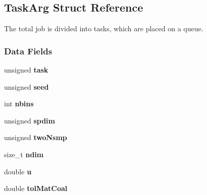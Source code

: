 \hypertarget{struct_task_arg}{\subsection{\-Task\-Arg \-Struct \-Reference}
\label{struct_task_arg}
}


\-The total job is divided into tasks, which are placed on a queue.  


\subsubsection*{\-Data \-Fields}
\begin{DoxyCompactItemize}
\item 
\hypertarget{struct_task_arg_ab8f93b1faba2a3b90657abf6688125b0}{unsigned {\bfseries task}}\label{struct_task_arg_ab8f93b1faba2a3b90657abf6688125b0}

\item 
\hypertarget{struct_task_arg_aacba1da926a87a14ebc43cdabc75705a}{unsigned {\bfseries seed}}\label{struct_task_arg_aacba1da926a87a14ebc43cdabc75705a}

\item 
\hypertarget{struct_task_arg_a94c04d470db4d9f1d699e5c473ead0ce}{int {\bfseries nbins}}\label{struct_task_arg_a94c04d470db4d9f1d699e5c473ead0ce}

\item 
\hypertarget{struct_task_arg_ad937451af34c15c5a44665c8c1209a9c}{unsigned {\bfseries spdim}}\label{struct_task_arg_ad937451af34c15c5a44665c8c1209a9c}

\item 
\hypertarget{struct_task_arg_a46f0a36e458165caec031ea51bf4938d}{unsigned {\bfseries two\-Nsmp}}\label{struct_task_arg_a46f0a36e458165caec031ea51bf4938d}

\item 
\hypertarget{struct_task_arg_ae58c1344e8cc4ccb2f294b4015cc8dcf}{size\-\_\-t {\bfseries ndim}}\label{struct_task_arg_ae58c1344e8cc4ccb2f294b4015cc8dcf}

\item 
\hypertarget{struct_task_arg_aced0dec026ce235848be079e19b4bf9a}{double {\bfseries u}}\label{struct_task_arg_aced0dec026ce235848be079e19b4bf9a}

\item 
\hypertarget{struct_task_arg_a13d4734f5e1ce70794d70a1cc452d5df}{double {\bfseries tol\-Mat\-Coal}}\label{struct_task_arg_a13d4734f5e1ce70794d70a1cc452d5df}


\end{DoxyCompactItemize}
